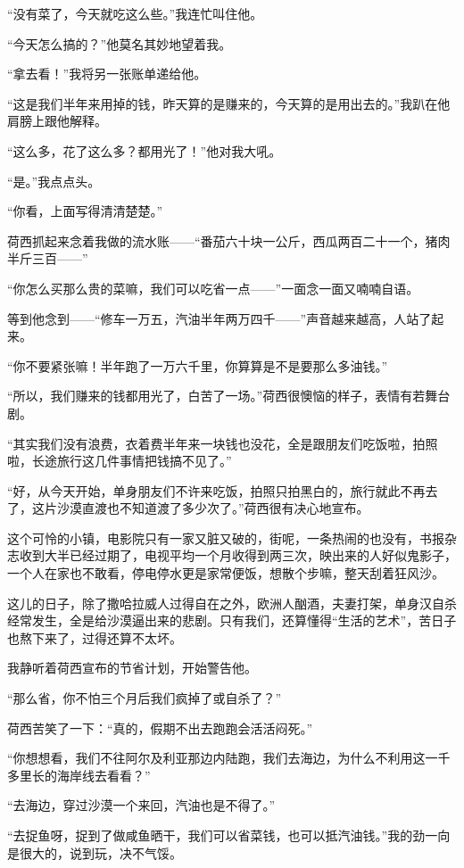 \par “没有菜了，今天就吃这么些。”我连忙叫住他。
\par “今天怎么搞的？”他莫名其妙地望着我。
\par “拿去看！”我将另一张账单递给他。
\par “这是我们半年来用掉的钱，昨天算的是赚来的，今天算的是用出去的。”我趴在他肩膀上跟他解释。
\par “这么多，花了这么多？都用光了！”他对我大吼。
\par “是。”我点点头。
\par “你看，上面写得清清楚楚。”
\par 荷西抓起来念着我做的流水账——“番茄六十块一公斤，西瓜两百二十一个，猪肉半斤三百——”
\par “你怎么买那么贵的菜嘛，我们可以吃省一点——”一面念一面又喃喃自语。
\par 等到他念到——“修车一万五，汽油半年两万四千——”声音越来越高，人站了起来。
\par “你不要紧张嘛！半年跑了一万六千里，你算算是不是要那么多油钱。”
\par “所以，我们赚来的钱都用光了，白苦了一场。”荷西很懊恼的样子，表情有若舞台剧。
\par “其实我们没有浪费，衣着费半年来一块钱也没花，全是跟朋友们吃饭啦，拍照啦，长途旅行这几件事情把钱搞不见了。”
\par “好，从今天开始，单身朋友们不许来吃饭，拍照只拍黑白的，旅行就此不再去了，这片沙漠直渡也不知道渡了多少次了。”荷西很有决心地宣布。
\par 这个可怜的小镇，电影院只有一家又脏又破的，街呢，一条热闹的也没有，书报杂志收到大半已经过期了，电视平均一个月收得到两三次，映出来的人好似鬼影子，一个人在家也不敢看，停电停水更是家常便饭，想散个步嘛，整天刮着狂风沙。
\par 这儿的日子，除了撒哈拉威人过得自在之外，欧洲人酗酒，夫妻打架，单身汉自杀经常发生，全是给沙漠逼出来的悲剧。只有我们，还算懂得“生活的艺术”，苦日子也熬下来了，过得还算不太坏。
\par 我静听着荷西宣布的节省计划，开始警告他。
\par “那么省，你不怕三个月后我们疯掉了或自杀了？”
\par 荷西苦笑了一下：“真的，假期不出去跑跑会活活闷死。”
\par “你想想看，我们不往阿尔及利亚那边内陆跑，我们去海边，为什么不利用这一千多里长的海岸线去看看？”
\par “去海边，穿过沙漠一个来回，汽油也是不得了。”
\par “去捉鱼呀，捉到了做咸鱼晒干，我们可以省菜钱，也可以抵汽油钱。”我的劲一向是很大的，说到玩，决不气馁。
